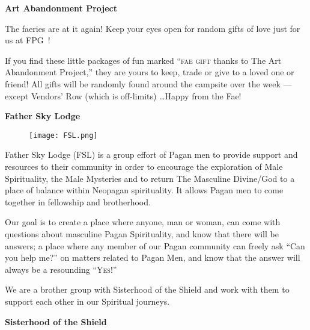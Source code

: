 \documentclass[9pt,twoside,openright,final,article]{memoir}
\def\fpg{{\beltanefamily FPG\ }}
\renewcommand{\subsection}[1]{%
  \vspace{6pt}%
  \needspace{1.25in}%
  \begin{center}\textbf{\Large \beltanefamily #1}\end{center}

  \nopagebreak}
\begin{document}
\begin{multicols}{2}


  \subsection{Art Abandonment Project}

  The faeries are at it again! Keep your eyes open for random gifts of
  love just for us at \fpg!

  If you find these little packages of fun marked ``\textsc{fae gift}
  thanks to The Art Abandonment Project,'' they are yours to keep,
  trade or give to a loved one or friend!  All gifts will be randomly
  found around the campsite over the week --- except Vendors' Row
  (which is off-limits) \ldots Happy \festseason{} from the Fae!


  \subsection{Father Sky Lodge}

  \begingroup
  \setlength{\columnsep}{6pt}%
  \begin{wrapfigure}{r}{.4\columnwidth}
    \texttt{[image: FSL.png]}
  \end{wrapfigure}

  Father Sky Lodge (FSL) is a group effort of Pagan men to provide
  support and resources to their community in order to encourage the
  exploration of Male Spirituality, the Male Mysteries and to return The
  Masculine Divine/God to a place of balance within Neopagan
  spirituality. It allows Pagan men to come together in fellowship and
  brotherhood.

  Our goal is to create a place where anyone, man or woman, can come
  with questions about masculine Pagan Spirituality, and know that
  there will be answers; a place where any member of our Pagan
  community can freely ask ``Can you help me?'' on matters related to
  Pagan Men, and know that the answer will always be a resounding
  ``\textsc{Yes}!''

  We are a brother group with Sisterhood of the Shield and work with
  them to support each other in our Spiritual journeys.

  \endgroup


  \subsection{Sisterhood of the Shield}


\end{multicols}
\end{document}
